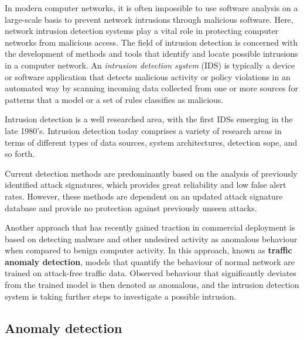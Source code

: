 \documentclass[a4paper,12pt,twoside]{report}
\begin{document}
In modern computer networks, it is often impossible to use software analysis on a large-scale basis to prevent network intrusions through malicious software. Here, network intrusion detection systems play a vital role in protecting computer networks from malicious access. The field of intrusion detection is concerned with the development of methods and tools that identify and locate possible intrusions in a computer network. An \textit{intrusion detection system} (IDS) is typically a device or software application that detects malicious activity or policy violations in an automated way by scanning incoming data collected from one or more sources for patterns that a model or a set of rules classifies as malicious.

Intrusion detection is a well researched area, with the first IDSs emerging in the late 1980's. Intrusion detection today comprises a variety of research areas in terms of different types of data sources, system architectures, detection sope, and so forth. %



Current detection methods are predominantly based on the analysis of previously identified attack signatures, which provides great reliability and low false alert rates. However, these methods are dependent on an updated attack signature database and provide no protection against previously unseen attacks. 

Another approach that has recently gained traction in commercial deployment is based on detecting malware and other undesired activity as anomalous behaviour when compared to benign computer activity. In this approach, known as \textbf{traffic anomaly detection}, models that quantify the behaviour of normal network are trained on attack-free traffic data. Observed behaviour that significantly deviates from the trained model is then denoted as anomalous, and the intrusion detection system is taking further steps to investigate a possible intrusion. 



\subsection{Anomaly detection}
\end{document}
